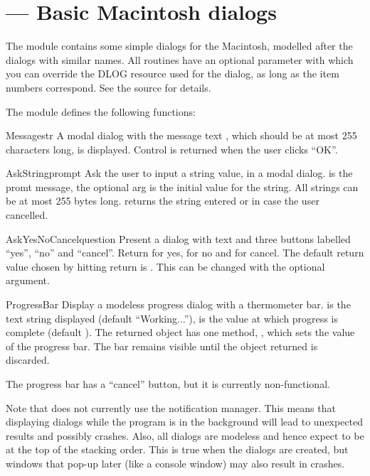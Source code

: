 \section{ ---
         Basic Macintosh dialogs}



The  module contains some simple dialogs for
the Macintosh, modelled after the
 dialogs with similar names. All
routines have an optional parameter  with which you can
override the DLOG resource used for the dialog, as long as the item
numbers correspond. See the source for details.
 
The  module defines the following functions:


\begin{funcdesc}{Message}{str}
A modal dialog with the message text , which should be at
most 255 characters long, is displayed. Control is returned when the
user clicks ``OK''.
\end{funcdesc}

\begin{funcdesc}{AskString}{prompt}
Ask the user to input a string value, in a modal dialog. 
is the promt message, the optional  arg is the initial
value for the string. All strings can be at most 255 bytes
long.  returns the string entered or 
in case the user cancelled.
\end{funcdesc}

\begin{funcdesc}{AskYesNoCancel}{question}
Present a dialog with text  and three buttons labelled
``yes'', ``no'' and ``cancel''. Return  for yes,  for
no and  for cancel. The default return value chosen by
hitting return is . This can be changed with the optional
 argument.
\end{funcdesc}

\begin{funcdesc}{ProgressBar}{}
Display a modeless progress dialog with a thermometer bar. 
is the text string displayed (default ``Working...''),  is
the value at which progress is complete (default ). The
returned object has one method, , which sets
the value of the progress bar. The bar remains visible until the
object returned is discarded.

The progress bar has a ``cancel'' button, but it is currently
non-functional.
\end{funcdesc}

Note that  does not currently use the notification
manager. This means that displaying dialogs while the program is in
the background will lead to unexpected results and possibly
crashes. Also, all dialogs are modeless and hence expect to be at the
top of the stacking order. This is true when the dialogs are created,
but windows that pop-up later (like a console window) may also result
in crashes.
